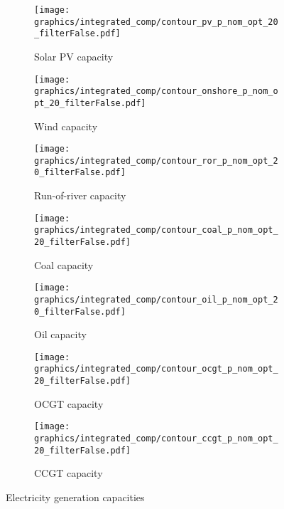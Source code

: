\begin{figure*}[t] %
    \centering
    \begin{subfigure}[b]{0.45\linewidth}
        \centering
        \texttt{[image: graphics/integrated\_comp/contour\_pv\_p\_nom\_opt\_20\_filterFalse.pdf]}
        \caption{Solar PV capacity}
    \end{subfigure}
    \hfill
    \begin{subfigure}[b]{0.45\linewidth}
        \centering
        \texttt{[image: graphics/integrated\_comp/contour\_onshore\_p\_nom\_opt\_20\_filterFalse.pdf]}
        \caption{Wind capacity}
    \end{subfigure}
    \hfill
    \begin{subfigure}[b]{0.45\linewidth}
        \centering
        \texttt{[image: graphics/integrated\_comp/contour\_ror\_p\_nom\_opt\_20\_filterFalse.pdf]}
        \caption{Run-of-river capacity}
    \end{subfigure}
    \hfill
    \begin{subfigure}[b]{0.45\linewidth}
        \centering
        \texttt{[image: graphics/integrated\_comp/contour\_coal\_p\_nom\_opt\_20\_filterFalse.pdf]}
        \caption{Coal capacity}
    \end{subfigure}
    \hfill
    \begin{subfigure}[b]{0.45\linewidth}
        \centering
        \texttt{[image: graphics/integrated\_comp/contour\_oil\_p\_nom\_opt\_20\_filterFalse.pdf]}
        \caption{Oil capacity}
    \end{subfigure}
    \hfill
    \begin{subfigure}[b]{0.45\linewidth}
        \centering
        \texttt{[image: graphics/integrated\_comp/contour\_ocgt\_p\_nom\_opt\_20\_filterFalse.pdf]}
        \caption{OCGT capacity}
    \end{subfigure}
    \hfill
    \begin{subfigure}[b]{0.45\linewidth}
        \centering
        \texttt{[image: graphics/integrated\_comp/contour\_ccgt\_p\_nom\_opt\_20\_filterFalse.pdf]}
        \caption{CCGT capacity}
    \end{subfigure}
    \hfill

    \caption{Electricity generation capacities}
    \label{fig:capacities}
\end{figure*}



